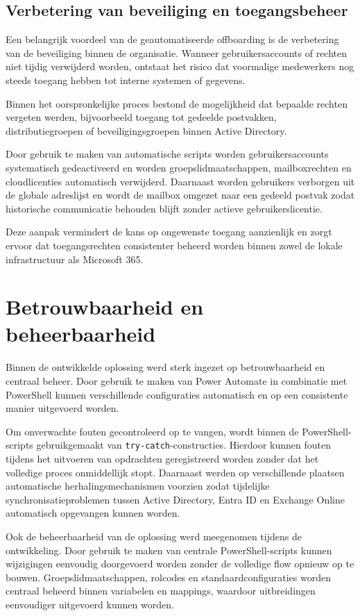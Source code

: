 \subsection{Verbetering van beveiliging en toegangsbeheer}

Een belangrijk voordeel van de geautomatiseerde offboarding is de verbetering van de beveiliging binnen de organisatie. Wanneer gebruikersaccounts of rechten niet tijdig verwijderd worden, ontstaat het risico dat voormalige medewerkers nog steeds toegang hebben tot interne systemen of gegevens.

Binnen het oorspronkelijke proces bestond de mogelijkheid dat bepaalde rechten vergeten werden, bijvoorbeeld toegang tot gedeelde postvakken, distributiegroepen of beveiligingsgroepen binnen Active Directory.

Door gebruik te maken van automatische scripts worden gebruikersaccounts systematisch gedeactiveerd en worden groepslidmaatschappen, mailboxrechten en cloudlicenties automatisch verwijderd. Daarnaast worden gebruikers verborgen uit de globale adreslijst en wordt de mailbox omgezet naar een gedeeld postvak zodat historische communicatie behouden blijft zonder actieve gebruikerslicentie.

Deze aanpak vermindert de kans op ongewenste toegang aanzienlijk en zorgt ervoor dat toegangsrechten consistenter beheerd worden binnen zowel de lokale infrastructuur als Microsoft 365.

\section{Betrouwbaarheid en beheerbaarheid}

Binnen de ontwikkelde oplossing werd sterk ingezet op betrouwbaarheid en centraal beheer. Door gebruik te maken van Power Automate in combinatie met PowerShell kunnen verschillende configuraties automatisch en op een consistente manier uitgevoerd worden.

Om onverwachte fouten gecontroleerd op te vangen, wordt binnen de PowerShell-scripts gebruikgemaakt van \texttt{try-catch}-constructies. Hierdoor kunnen fouten tijdens het uitvoeren van opdrachten geregistreerd worden zonder dat het volledige proces onmiddellijk stopt. Daarnaast werden op verschillende plaatsen automatische herhalingsmechanismen voorzien zodat tijdelijke synchronisatieproblemen tussen Active Directory, Entra ID en Exchange Online automatisch opgevangen kunnen worden.

Ook de beheerbaarheid van de oplossing werd meegenomen tijdens de ontwikkeling. Door gebruik te maken van centrale PowerShell-scripts kunnen wijzigingen eenvoudig doorgevoerd worden zonder de volledige flow opnieuw op te bouwen. Groepslidmaatschappen, rolcodes en standaardconfiguraties worden centraal beheerd binnen variabelen en mappings, waardoor uitbreidingen eenvoudiger uitgevoerd kunnen worden.

